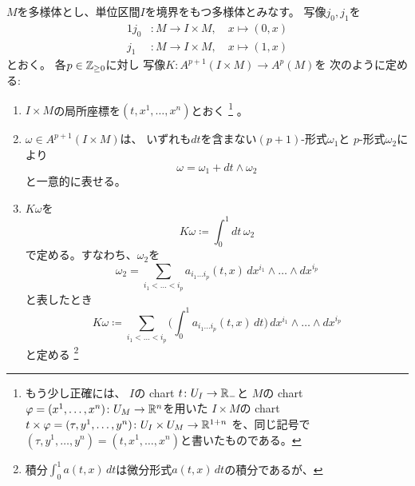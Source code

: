 \documentclass[report]{jlreq}
\begin{document}
\begin{lemma}[ホモトピー作用素$K$]
    $M$を多様体とし、単位区間$I$を境界をもつ多様体とみなす。
    写像$j_0, j_1$を
    \begin{alignat}{1}
        j_0 &\colon M \to I \times M, \quad x \mapsto (0, x) \\
        j_1 &\colon M \to I \times M, \quad x \mapsto (1, x)
    \end{alignat}
    とおく。
    各$p \in \mathbb{Z}_{\ge 0}$に対し
    写像$K \colon A^{p + 1}(I \times M) \to A^p(M)$を
    次のように定める:
    \begin{enumerate}
        \item $I \times M$の局所座標を$(t, x^1, \dots, x^n)$とおく
        \footnote{
            もう少し正確には、
            $I$の chart $t \colon U_I \to \mathbb{R}_{-}$と
            $M$の chart $\varphi = (x^1, \dots, x^n) \colon U_M \to \mathbb{R}^n$を用いた
            $I \times M$の chart
            $t \times \varphi = (\tau, y^1, \dots, y^n) \colon U_I \times U_M \to \mathbb{R}^{1 + n}$
            を、同じ記号で$(\tau, y^1, \dots, y^n) = (t, x^1, \dots, x^n)$と書いたものである。
        }
        。
        \item $\omega \in A^{p + 1}(I \times M)$は、
            いずれも$dt$を含まない$(p + 1)$-形式$\omega_1$と
            $p$-形式$\omega_2$により
            \begin{equation}
                \omega = \omega_1 + dt \wedge \omega_2
            \end{equation}
            と一意的に表せる。
        \item $K\omega$を
            \begin{equation}
                K\omega \coloneqq \int_0^1 dt \, \omega_2
            \end{equation}
            で定める。すなわち、$\omega_2$を
            \begin{equation}
                \omega_2 = \sum_{i_1 < \dots < i_p}
                    a_{i_1 \dots i_p} (t, x) \, dx^{i_1} \wedge \dots \wedge dx^{i_p}
            \end{equation}
            と表したとき
            \begin{equation}
                K\omega \coloneqq \sum_{i_1 < \dots < i_p}
                    \biggr( \int_0^1 a_{i_1 \dots i_p} (t, x) \, dt \biggl)
                    \, dx^{i_1} \wedge \dots \wedge dx^{i_p}
            \end{equation}
            と定める
            \footnote{
                積分$\int_0^1 a(t, x) \, dt$は微分形式$a(t, x) \, dt$の積分であるが、
}
\end{enumerate}
\end{lemma}
\end{document}
